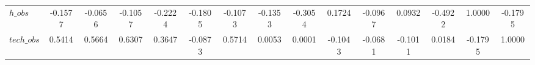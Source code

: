 \begin{center}
\begin{longtable}{lcccccccccccccc}
$h\_obs         $	 & 	          -0.1577	 & 	          -0.0656	 & 	          -0.1057	 & 	          -0.2224	 & 	          -0.1805	 & 	          -0.1073	 & 	          -0.1353	 & 	          -0.3054	 & 	           0.1724	 & 	          -0.0967	 & 	           0.0932	 & 	          -0.4922	 & 	           1.0000	 & 	          -0.1795 \\ 
$tech\_obs      $	 & 	           0.5414	 & 	           0.5664	 & 	           0.6307	 & 	           0.3647	 & 	          -0.0873	 & 	           0.5714	 & 	           0.0053	 & 	           0.0001	 & 	          -0.1043	 & 	          -0.0681	 & 	          -0.1011	 & 	           0.0184	 & 	          -0.1795	 & 	           1.0000 \\ 
\end{longtable}
 \end{center}
